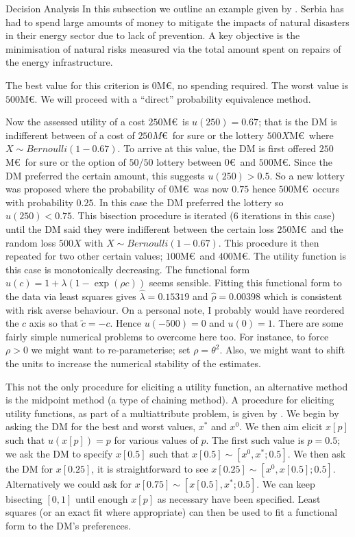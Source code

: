 \begin{chapter}{Decision Analysis \label{Ch:decision}}
In this subsection we outline an example given by \citet{Gonzalez2018}. Serbia has had to spend large amounts of money to mitigate the impacts of natural disasters in their energy sector due to lack of prevention. A key objective is the minimisation of natural risks measured via the total amount spent on repairs of the energy infrastructure.

The best value for this criterion is $0$M\euro, no spending required. The worst value is $500$M\euro. We will proceed with a ``direct'' probability equivalence method.

Now the assessed utility of a cost $250$M\euro\ is $u(250) = 0.67$; that is the DM is indifferent between of a cost of $250M$\euro\ for sure or the lottery $500 X$M\euro\ where $X \sim Bernoulli(1 - 0.67)$. To arrive at this value, the DM is first offered $250$M\euro\ for sure or the option of $50/50$ lottery between $0$\euro\ and $500$M\euro. Since the DM preferred the certain amount, this suggests $u(250)>0.5$. So a new lottery was proposed where the probability of $0$M\euro\ was now $0.75$ hence $500$M\euro\ occurs with probability $0.25$. In this case the DM preferred the lottery so $u(250)<0.75$. This bisection procedure is iterated (6 iterations in this case) until the DM said they were indifferent between the certain loss $250$M\euro\ and the random loss $500 X$ with $X \sim Bernoulli (1-0.67)$. This procedure it then repeated for two other certain values; $100$M\euro\ and $400$M\euro. The utility function is this case is monotonically decreasing. The functional form $u(c) = 1 + \lambda(1 - \exp (\rho c))$ seems sensible. Fitting this functional form to the data via least squares gives $\hat{\lambda} = 0.15319$ and $\hat{\rho} = 0.00398$ which is consistent with risk averse behaviour. On a personal note, I probably would have reordered the $c$ axis so that $\tilde{c} = -c$. Hence $u(-500) = 0$ and $u(0) = 1$. There are some fairly simple numerical problems to overcome here too. For instance, to force $\rho >0$ we might want to re-parameterise; set $\rho = \theta^2$. Also, we might want to shift the units to increase the numerical stability of the estimates.

This not the only procedure for eliciting a utility function, an alternative method is the midpoint method (a type of chaining method). A procedure for eliciting utility functions, as part of a multiattribute problem, is given by \citet{Smith2010}. We begin by asking the DM for the best and worst values, $x^*$ and $x^0$. We then aim elicit $x[p]$ such that $u(x[p])=p$ for various values of $p$. The first such value is $p=0.5$; we ask the DM to specify $x[0.5]$ such that $x[0.5] \sim [x^0, x^*;0.5]$. We then ask the DM for $x[0.25]$, it is straightforward to see $x[0.25] \sim [x^0, x[0.5] ; 0.5]$. Alternatively we could ask for $x[0.75] \sim [x[0.5], x^*;0.5]$. We can keep bisecting $[0,1]$ until enough $x[p]$ as necessary have been specified. Least squares (or an exact fit where appropriate) can then be used to fit a functional form to the DM's preferences.


\end{chapter}
